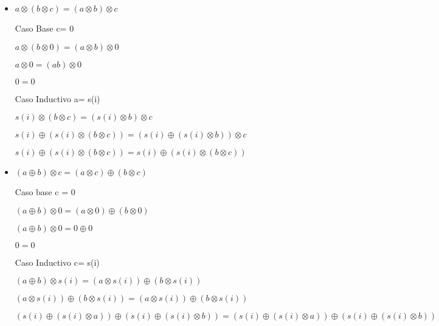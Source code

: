 \documentclass{article}
\begin{document}
\begin{itemize}
        \item{$a \otimes (b \otimes c)=(a\otimes b)\otimes c$}
        \begin{flushleft}
            Caso Base c= 0
        \end{flushleft}
        \begin{flushleft}
            $a \otimes (b\otimes 0) = (a \otimes b) \otimes 0$
        \end{flushleft}
        \begin{flushleft}
            $a \otimes 0  = (ab) \otimes 0$
        \end{flushleft}
        \begin{flushleft}
            $0=0$
        \end{flushleft}
        \begin{flushleft}
            Caso Inductivo a= s(i)
        \end{flushleft}
        \begin{flushleft}
            $s(i) \otimes (b \otimes c)=(s(i)\otimes b)\otimes c$
        \end{flushleft}
        \begin{flushleft}
            $s(i) \oplus (s(i) \otimes (b\otimes c)) = (s(i) \oplus (s(i) \otimes b)) \otimes c$
        \end{flushleft}
        \begin{flushleft}
           $s(i) \oplus (s(i) \otimes (b\otimes c)) = s(i) \oplus (s(i) \otimes (b\otimes c))$ 
        \end{flushleft}
        \item{$(a\oplus b)\otimes c = (a\otimes c) \oplus (b \otimes c)$}
        \begin{flushleft}
            Caso base c = 0
        \end{flushleft}
        \begin{flushleft}
            $(a\oplus b)\otimes 0 = (a\otimes 0) \oplus (b \otimes 0)$
        \end{flushleft}
        \begin{flushleft}
            $(a\oplus b)\otimes 0 = 0 \oplus 0$
        \end{flushleft}
        \begin{flushleft}
            $0 =0$
        \end{flushleft}
        \begin{flushleft}
            Caso Inductivo c= s(i) 
        \end{flushleft}
        \begin{flushleft}
            $(a\oplus b)\otimes s(i) = (a\otimes s(i)) \oplus (b \otimes s(i))$
        \end{flushleft}
        \begin{flushleft}
            $(a\otimes s(i)) \oplus (b \otimes s(i)) =  (a\otimes s(i)) \oplus (b \otimes s(i)) $
        \end{flushleft}
        \begin{flushleft}
            $(s(i) \oplus (s(i)\otimes a)) \oplus (s(i) \oplus (s(i)\otimes b)) = (s(i) \oplus (s(i)\otimes a)) \oplus (s(i) \oplus (s(i)\otimes b))$
        \end{flushleft}
\end{itemize}
\end{document}
